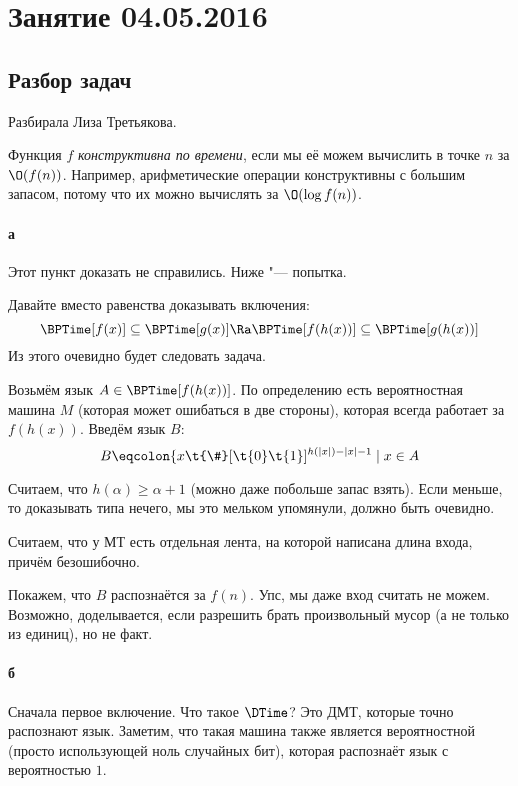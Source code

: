 \chapter{Занятие 04.05.2016}

\section{Разбор задач}
	Разбирала Лиза Третьякова.

	\begin{Def}
		Функция $f$ \textit{конструктивна по времени}, если мы её можем вычислить в точке $n$
		за $\O(f(n))$.
		Например, арифметические операции конструктивны с большим запасом, потому что
		их можно вычислять за $\O(\log f(n))$.
	\end{Def}

	\subsubsection{а}
		Этот пункт доказать не справились.
		Ниже "--- попытка.

		Давайте вместо равенства доказывать включения:
		\[ \BPTime[f(x)] \subseteq \BPTime[g(x)]  \Ra \BPTime[f(h(x))] \subseteq \BPTime[g(h(x))] \]
		Из этого очевидно будет следовать задача.

		Возьмём язык $A \in \BPTime[f(h(x))]$.
		По определению есть вероятностная машина $M$ (которая может ошибаться в две стороны), которая
		всегда работает за $f(h(x))$.
		Введём язык $B$:
		\[ B \eqcolon \{ x\t{\#}[\t{0}\t{1}]^{h(|x|)-|x|-1} \mid x \in A \]
		\begin{Rem}
			Считаем, что $h(\alpha) \ge \alpha + 1$ (можно даже побольше запас взять).
			Если меньше, то доказывать типа нечего, мы это мельком упомянули, должно быть очевидно.
		\end{Rem}
		\begin{Rem}
			Считаем, что у МТ есть отдельная лента, на которой написана длина входа, причём безошибочно.
		\end{Rem}
		Покажем, что $B$ распознаётся за $f(n)$.
		Упс, мы даже вход считать не можем.
		Возможно, доделывается, если разрешить брать произвольный мусор (а не только из единиц), но не факт.

	\subsubsection{б}
		Сначала первое включение.
		Что такое $\DTime$?
		Это ДМТ, которые точно распознают язык.
		Заметим, что такая машина также является вероятностной (просто использующей ноль случайных бит), которая распознаёт язык с вероятностью $1$.


